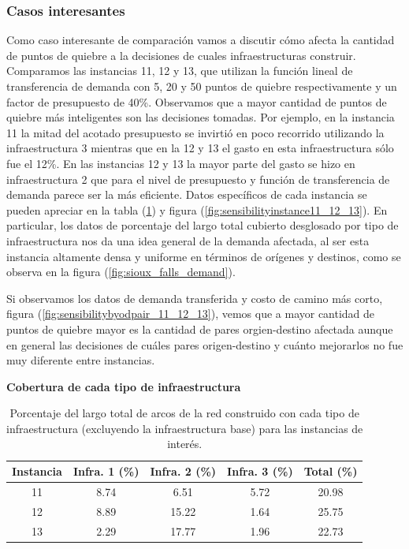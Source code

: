 \documentclass{article}
\begin{document}
  \FloatBarrier
  \subsubsection*{Casos interesantes}

  Como caso interesante de comparación vamos a discutir cómo afecta la cantidad de puntos de quiebre a la decisiones de cuales infraestructuras construir. Comparamos las instancias 11, 12 y 13, que utilizan la función lineal de transferencia de demanda con 5, 20 y 50 puntos de quiebre respectivamente y un factor de presupuesto de 40\%. Observamos que a mayor cantidad de puntos de quiebre más inteligentes son las decisiones tomadas. Por ejemplo, en la instancia 11 la mitad del acotado presupuesto se invirtió en poco recorrido utilizando la infraestructura 3 mientras que en la 12 y 13 el gasto en esta infraestructura sólo fue el 12\%. En las instancias 12 y 13 la mayor parte del gasto se hizo en infraestructura 2 que para el nivel de presupuesto y función de transferencia de demanda parece ser la más eficiente. Datos específicos de cada instancia se pueden apreciar en la tabla (\ref{table:sensibilityinfralengths}) y figura (\ref{fig:sensibilityinstance11_12_13}). En particular, los datos de porcentaje del largo total cubierto desglosado por tipo de infraestructura nos da una idea general de la demanda afectada, al ser esta instancia altamente densa y uniforme en términos de orígenes y destinos, como se observa en la figura (\ref{fig:sioux_falls_demand}).

  Si observamos los datos de demanda transferida y costo de camino más corto, figura (\ref{fig:sensibilitybyodpair_11_12_13}), vemos que a mayor cantidad de puntos de quiebre mayor es la cantidad de pares orgien-destino afectada aunque en general las decisiones de cuáles pares origen-destino y cuánto mejorarlos no fue muy diferente entre instancias.

  \begin{table}[h!]
    \centering
    \caption*{{\bf Cobertura de cada tipo de infraestructura}}
    \begin{tabular}{ccccc}
      \toprule
        Instancia & Infra. 1 (\%) & Infra. 2 (\%) & Infra. 3 (\%) & Total (\%) \\
      \midrule
        11 & 8.74  & 6.51   & 5.72 & 20.98 \\
        12 & 8.89  & 15.22  & 1.64 & 25.75 \\
        13 & 2.29  & 17.77  & 1.96 & 22.73 \\
      \bottomrule
    \end{tabular}
    \caption{Porcentaje del largo total de arcos de la red construido con cada tipo de infraestructura (excluyendo la infraestructura base) para las instancias de interés.}\label{table:sensibilityinfralengths}
  \end{table}
\end{document}
